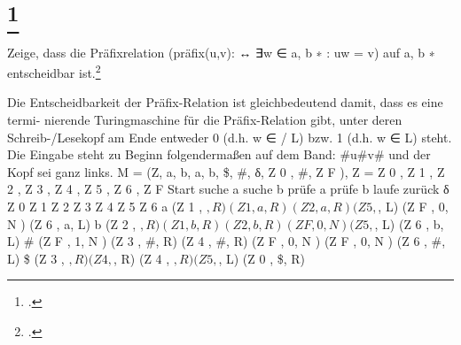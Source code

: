 \documentclass{lehramt-informatik-aufgabe}
\begin{document}
\liAufgabenTitel{}
\section{
\footcite{66112:2002:03}}

Zeige, dass die Präﬁxrelation (präﬁx(u,v): ↔ ∃w ∈ {a, b} ∗ : uw = v) auf {a, b} ∗
entscheidbar ist.\footcite[Aufgabe 7a)]{theo:ab:4}

Die Entscheidbarkeit der Präﬁx-Relation ist gleichbedeutend damit, dass es eine termi-
nierende Turingmaschine für die Präﬁx-Relation gibt, unter deren Schreib-/Lesekopf am
Ende entweder 0 (d.h. w ∈
/ L) bzw. 1 (d.h. w ∈ L) steht.
Die Eingabe steht zu Beginn folgendermaßen auf dem Band: \#u\#v\# und der Kopf sei
ganz links.
M = (Z, {a, b}, {a, b, \$, \#}, δ, Z 0 , \#, {Z F }), Z = {Z 0 , Z 1 , Z 2 , Z 3 , Z 4 , Z 5 , Z 6 , Z F }
Start
suche a
suche b
prüfe a
prüfe b
laufe zurück
δ
Z 0
Z 1
Z 2
Z 3
Z 4
Z 5
Z 6
a (Z 1 , $, R) (Z 1 , a, R) (Z 2 , a, R)
(Z 5 , $, L) (Z F , 0, N )
(Z 6 , a, L)
b (Z 2 , $, R)
(Z 1 , b, R)
(Z 2 , b, R) (Z F , 0, N ) (Z 5 , $, L)
(Z 6 , b, L)
\# (Z F , 1, N ) (Z 3 , \#, R) (Z 4 , \#, R) (Z F , 0, N ) (Z F , 0, N ) (Z 6 , \#, L)
\$
(Z 3 , $, R) (Z 4 , $, R) (Z 4 , $, R) (Z 5 , $, L) (Z 0 , \$, R)
\end{document}
